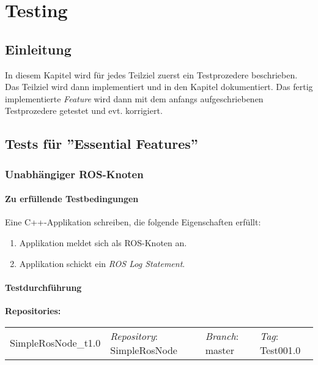 
\chapter{Testing}
\section{Einleitung}
In diesem Kapitel wird für jedes Teilziel zuerst ein Testprozedere beschrieben.
Das Teilziel wird dann implementiert und in den Kapitel %
dokumentiert.
Das fertig implementierte \textit{Feature} wird dann mit dem anfangs aufgeschriebenen Testprozedere getestet und evt. korrigiert.


\section{Tests für ''Essential Features''}
\subsection{Unabhängiger ROS-Knoten}
\subsubsection{Zu erfüllende Testbedingungen}
Eine C++-Applikation schreiben, die folgende Eigenschaften erfüllt:
\begin{enumerate}
\item Applikation meldet sich als ROS-Knoten an.
\item Applikation schickt ein \textit{ROS Log Statement}.
\end{enumerate}

\subsubsection{Testdurchführung}
\textbf{Repositories:} \\
\begin{tabular}
  { l						| l			 							l								 l								}
  SimpleRosNode\_t1.0		& \textit{Repository}: SimpleRosNode	& \textit{Branch}: master		& \textit{Tag}: Test001.0 		\\
\end{tabular}

